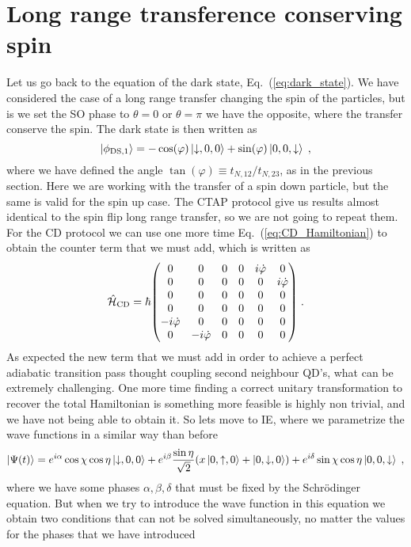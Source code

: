 \section{Long range transference conserving spin}
Let us go back to the equation of the dark state, Eq.~(\ref{eq:dark_state}). We have considered the case of a long range transfer changing the spin of the particles, but is we set the SO phase to $\theta=0$ or $\theta=\pi$ we have the opposite, where the transfer conserve the spin. The dark state is then written as
\begin{equation}
	\ket{\phi_{\text{DS},1}}=-\cos(\varphi)\ket{\downarrow,0,0}+\sin(\varphi)\ket{0,0,\downarrow}\; ,
\end{equation}
where we have defined the angle $\tan(\varphi)\equiv t_{N,12}/t_{N,23}$, as in the previous section. Here we are working with the transfer of a spin down particle, but the same is valid for the spin up case. The CTAP protocol give us results almost identical to the spin flip long range transfer, so we are not going to repeat them. For the CD protocol we can use one more time Eq.~(\ref{eq:CD_Hamiltonian}) to obtain the counter term that we must add, which is written as
\begin{equation}
	\hat{\mathcal{H}}_{\text{CD}}=\hbar \mqty(0 & 0 & 0 &0 &i\dot{\varphi} & 0 \\ 0 & 0 & 0 & 0 & 0 & i\dot{\varphi}\\ 0 & 0 & 0 & 0 & 0 & 0 \\ 0 & 0 & 0 & 0 & 0 & 0 \\ -i\dot{\varphi} & 0 & 0 & 0 & 0 & 0 \\ 0 & -i\dot{\varphi} & 0 & 0 & 0 & 0)\; .
\end{equation}
As expected the new term that we must add in order to achieve a perfect adiabatic transition pass thought coupling second neighbour QD's, what can be extremely challenging. One more time finding a correct unitary transformation to recover the total Hamiltonian is something more feasible is highly non trivial, and we have not being able to obtain it. So lets move to IE, where we parametrize the wave functions in a similar way than before
\begin{equation}
\ket{\Psi(t)}=e^{i\alpha}\cos\chi\cos\eta\ket{\downarrow,0,0}+e^{i\beta}\frac{\sin\eta}{\sqrt{2}}(x\ket{0,\uparrow,0}+\ket{0,\downarrow,0})+e^{i\delta}\sin\chi\cos\eta \ket{0,0,\downarrow}\; ,
\label{eq:wave_functions_parametrization_2}
\end{equation} 
where we have some phases $\alpha,\beta,\delta$ that must be fixed by the Schrödinger equation. But when we try to introduce the wave function in this equation we obtain two conditions that can not be solved simultaneously, no matter the values for the phases that we have introduced
